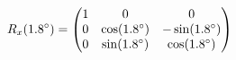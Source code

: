\documentclass[preview]{standalone}
\begin{document}
\begin{align*}
\special{dvisvgm:raw <g id='unique000'>}R_x(1.8^\circ) = \begin{pmatrix} 1 & 0 & 0 \\ 0 & \cos(1.8^\circ) & -\sin(1.8^\circ) \\ 0 & \sin(1.8^\circ) & \cos(1.8^\circ) \end{pmatrix}\special{dvisvgm:raw </g>}
\end{align*}
\end{document}
